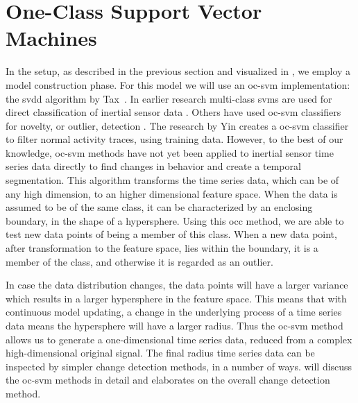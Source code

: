 \section{One-Class Support Vector Machines}
In the setup, as described in the previous section and visualized in , we employ a model construction phase.
For this model we will use an \acrlong{oc-svm} implementation: the \acrlong{svdd} algorithm by Tax~\cite{tax2001one}.
In earlier research multi-class \glspl{svm} are used for direct classification of inertial sensor data \cite{he2008activity,mountrakis2011support,anguita2012human}.
Others have used \gls{oc-svm} classifiers for novelty, or outlier, detection \cite{scholkopf1999support,camci2010change,li2003improving,ma2003time,tax1999support}.
The research by Yin \etal  \cite{yin2008sensor} creates a \gls{oc-svm} classifier to filter normal activity traces, using training data.
However, to the best of our knowledge, \gls{oc-svm} methods have not yet been applied to inertial sensor time series data directly to find changes in behavior and create a temporal segmentation.
This algorithm transforms the time series data, which can be of any high dimension, to an higher dimensional feature space.
When the data is assumed to be of the same class, it can be characterized by an enclosing boundary, in the shape of a hypersphere.
Using this \gls{occ} method, we are able to test new data points of being a member of this class.
When a new data point, after transformation to the feature space, lies within the boundary, it is a member of the class, and otherwise it is regarded as an outlier.

In case the data distribution changes, the data points will have a larger variance which results in a larger hypersphere in the feature space.
This means that with continuous model updating, a change in the underlying process of a time series data means the hypersphere will have a larger radius.
Thus the \gls{oc-svm} method allows us to generate a one-dimensional time series data, reduced from a complex high-dimensional original signal.
The final radius time series data can be inspected by simpler change detection methods, in a number of ways.
 will discuss the \gls{oc-svm} methods in detail and  elaborates on the overall change detection method.

